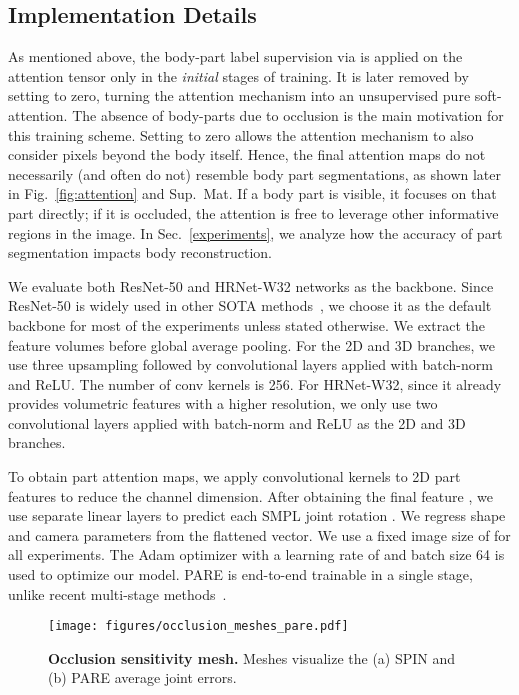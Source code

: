 \documentclass[10pt,twocolumn,letterpaper,usenames,dvipsnames]{article}
\newcommand{\supmat}{Sup.~Mat.\xspace}
\begin{document}
\subsection{Implementation Details}
\label{sec:implementation}
As mentioned above, the body-part label supervision via  is applied on the attention tensor  only in the \emph{initial} stages of training. 
It is later removed by setting  to zero, turning the attention mechanism into an unsupervised pure soft-attention. 
The absence of body-parts due to occlusion is the main motivation for this training scheme. 
Setting  to zero allows the attention mechanism to also consider pixels beyond the body itself. 
Hence, the final attention maps do not necessarily (and often do not) resemble body part segmentations, as shown later in Fig.~\ref{fig:attention} and \supmat
If a body part is visible, it focuses on that part directly; if it is occluded, the attention is free to leverage other informative regions in the image. 
In Sec.~\ref{experiments}, we analyze how the accuracy of part segmentation impacts body reconstruction.

We evaluate both ResNet-50 \cite{he2016resnet} and HRNet-W32 \cite{hrnet} networks as the backbone. 
Since ResNet-50 is widely used in other SOTA methods~\cite{kanazawa_hmr,kocabas2019vibe,SPIN:ICCV:2019}, we choose it as the default backbone for most of the experiments unless stated otherwise. 
We extract the  feature volumes before global average pooling. For the 2D and 3D branches, we use three  upsampling followed by  convolutional layers applied with batch-norm and ReLU. The number of conv kernels is 256. 
For HRNet-W32, since it already provides volumetric features with a higher resolution, we only use two  convolutional layers applied with batch-norm and ReLU as the 2D and 3D branches. 

To obtain part attention maps, we apply   convolutional kernels to 2D part features to reduce the channel dimension. 
After obtaining the  final feature , we use separate linear layers to predict each SMPL joint rotation . We regress shape and camera parameters from the flattened  vector. We use a fixed image size of  for all experiments. The Adam optimizer with a learning rate of  and batch size 64 is used to optimize our model. PARE is end-to-end trainable in a single stage, unlike recent multi-stage methods~\cite{Choi_2020_ECCV_Pose2Mesh,guler_2019_CVPR,Moon_2020_ECCV_I2L-MeshNet,zanfir2020weakly}. 	\begin{figure}[t]
	\centering
	\texttt{[image: figures/occlusion\_meshes\_pare.pdf]}
	\caption{\textbf{Occlusion sensitivity mesh.} Meshes visualize the (a) SPIN and (b) PARE average joint errors.
	}
	\label{fig:occ_meshes_pare}
	\vspace{-2ex}
\end{figure}{}
\end{document}
